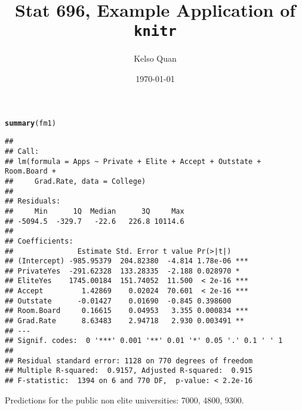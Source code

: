 \documentclass{article}\usepackage[]{graphicx}\usepackage[]{color}
\title{Stat 696, Example Application of \texttt{knitr}}
\author{Kelso Quan}
\date{\today}
\makeatletter
\newcommand{\hlstd}[1]{\textcolor[rgb]{0.345,0.345,0.345}{#1}}%
\newcommand{\hlkwd}[1]{\textcolor[rgb]{0.737,0.353,0.396}{\textbf{#1}}}%
\newenvironment{kframe}{%
 \def\at@end@of@kframe{}%
 \ifinner\ifhmode%
  \def\at@end@of@kframe{\end{minipage}}%
  \begin{minipage}{\columnwidth}%
 \fi\fi%
 \def\FrameCommand##1{\hskip\@totalleftmargin \hskip-\fboxsep
 \colorbox{shadecolor}{##1}\hskip-\fboxsep
     \hskip-\linewidth \hskip-\@totalleftmargin \hskip\columnwidth}%
 \MakeFramed {\advance\hsize-\width
   \@totalleftmargin\z@ \linewidth\hsize
   \@setminipage}}%
 {\par\unskip\endMakeFramed%
 \at@end@of@kframe}
\newenvironment{knitrout}{}{} %
\makeatother
\begin{document}
 

\maketitle





  




\begin{knitrout}
\color{fgcolor}\begin{kframe}
\begin{alltt}
\hlkwd{summary}\hlstd{(fm1)}
\end{alltt}
\begin{verbatim}
## 
## Call:
## lm(formula = Apps ~ Private + Elite + Accept + Outstate + Room.Board + 
##     Grad.Rate, data = College)
## 
## Residuals:
##     Min      1Q  Median      3Q     Max 
## -5094.5  -329.7   -22.6   226.8 10114.6 
## 
## Coefficients:
##               Estimate Std. Error t value Pr(>|t|)    
## (Intercept) -985.95379  204.82380  -4.814 1.78e-06 ***
## PrivateYes  -291.62328  133.28335  -2.188 0.028970 *  
## EliteYes    1745.00184  151.74052  11.500  < 2e-16 ***
## Accept         1.42869    0.02024  70.601  < 2e-16 ***
## Outstate      -0.01427    0.01690  -0.845 0.398600    
## Room.Board     0.16615    0.04953   3.355 0.000834 ***
## Grad.Rate      8.63483    2.94718   2.930 0.003491 ** 
## ---
## Signif. codes:  0 '***' 0.001 '**' 0.01 '*' 0.05 '.' 0.1 ' ' 1
## 
## Residual standard error: 1128 on 770 degrees of freedom
## Multiple R-squared:  0.9157,	Adjusted R-squared:  0.915 
## F-statistic:  1394 on 6 and 770 DF,  p-value: < 2.2e-16
\end{verbatim}
\end{kframe}
\end{knitrout}
Predictions for the public non elite universities: 7000, 4800, 9300.
\end{document}
